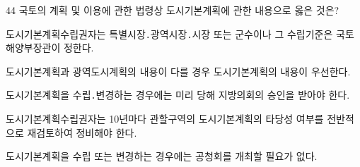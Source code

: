 \begin{question}{44}
국토의 계획 및 이용에 관한 법령상 도시기본계획에 관한 내용으로 옳은 것은?
\begin{choices}
  \item 도시기본계획수립권자는 특별시장․광역시장․시장 또는 군수이나 그 수립기준은 국토해양부장관이 정한다.
  \item 도시기본계획과 광역도시계획의 내용이 다를 경우 도시기본계획의 내용이 우선한다.
  \item 도시기본계획을 수립․변경하는 경우에는 미리 당해 지방의회의 승인을 받아야 한다.
  \item 도시기본계획수립권자는 10년마다 관할구역의 도시기본계획의 타당성 여부를 전반적으로 재검토하여 정비해야 한다.
  \item 도시기본계획을 수립 또는 변경하는 경우에는 공청회를 개최할 필요가 없다.
\end{choices}
\end{question}
